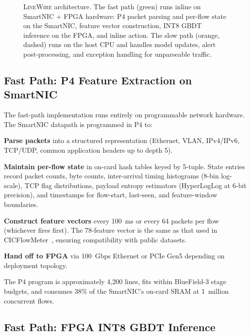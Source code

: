 \documentclass[sigconf,nonacm]{acmart}
\begin{document}
\begin{figure}[t]
\caption{\textsc{LineWire} architecture. The fast path (green) runs
  inline on SmartNIC + FPGA hardware: P4 packet parsing and per-flow
  state on the SmartNIC, feature vector construction, INT8 GBDT
  inference on the FPGA, and inline action. The slow path (orange,
  dashed) runs on the host CPU and handles model updates, alert
  post-processing, and exception handling for unparseable traffic.}
\label{fig:arch}
\end{figure}

\subsection{Fast Path: P4 Feature Extraction on SmartNIC}

The fast-path implementation runs entirely on programmable network
hardware. The SmartNIC datapath is programmed in P4 to:

\textbf{Parse packets} into a structured representation (Ethernet,
VLAN, IPv4/IPv6, TCP/UDP, common application headers up to depth 5).

\textbf{Maintain per-flow state} in on-card hash tables keyed by
5-tuple. State entries record packet counts, byte counts, inter-arrival
timing histograms (8-bin log-scale), TCP flag distributions, payload
entropy estimators (HyperLogLog at 6-bit precision), and timestamps for
flow-start, last-seen, and feature-window boundaries.

\textbf{Construct feature vectors} every 100~ms or every 64 packets per
flow (whichever fires first). The 78-feature vector is the same as
that used in CICFlowMeter~\cite{cicflowmeter}, ensuring compatibility
with public datasets.

\textbf{Hand off to FPGA} via 100~Gbps Ethernet or PCIe Gen5 depending
on deployment topology.

The P4 program is approximately 4{,}200 lines, fits within
BlueField-3 stage budgets, and consumes 38\% of the SmartNIC's
on-card SRAM at 1~million concurrent flows.

\subsection{Fast Path: FPGA INT8 GBDT Inference}
\end{document}
